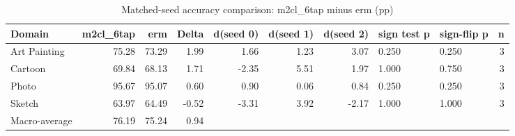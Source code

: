 \begin{table}
\caption{Matched-seed accuracy comparison: m2cl_6tap minus erm (pp)}
\label{tab:acc_m2cl_6tap_vs_erm}
\begin{tabular}{lrrrrrrllr}
\toprule
Domain & m2cl\_6tap & erm & Delta & d(seed 0) & d(seed 1) & d(seed 2) & sign test p & sign-flip p & n \\
\midrule
Art Painting & 75.28 & 73.29 & 1.99 & 1.66 & 1.23 & 3.07 & 0.250 & 0.250 & 3 \\
Cartoon & 69.84 & 68.13 & 1.71 & -2.35 & 5.51 & 1.97 & 1.000 & 0.750 & 3 \\
Photo & 95.67 & 95.07 & 0.60 & 0.90 & 0.06 & 0.84 & 0.250 & 0.250 & 3 \\
Sketch & 63.97 & 64.49 & -0.52 & -3.31 & 3.92 & -2.17 & 1.000 & 1.000 & 3 \\
Macro-average & 76.19 & 75.24 & 0.94 &  &  &  &  &  &  \\
\bottomrule
\end{tabular}
\end{table}
